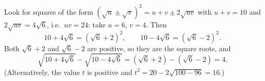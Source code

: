 Look for squares of the form $\left(\sqrt u\pm\sqrt v\right)^2=u+v\pm2\sqrt{uv}$ with $u+v=10$ and $2\sqrt{uv}=4\sqrt6$, i.e.\ $uv=24$: take $u=6$, $v=4$. Then
\[
10+4\sqrt6=\left(\sqrt6+2\right)^2,\qquad10-4\sqrt6=\left(\sqrt6-2\right)^2 .
\]
Both $\sqrt6+2$ and $\sqrt6-2$ are positive, so they are the square roots, and
\[
\sqrt{10+4\sqrt6}-\sqrt{10-4\sqrt6}=\left(\sqrt6+2\right)-\left(\sqrt6-2\right)=\boxed{4}.
\]
(Alternatively, the value $t$ is positive and $t^2=20-2\sqrt{100-96}=16$.)

